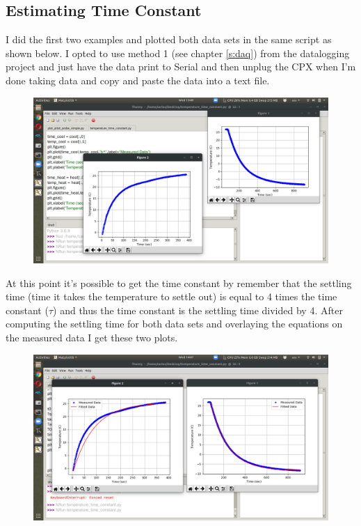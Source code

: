 \subsection{Estimating Time Constant}
I did the first two examples and plotted both data sets in the same script as shown below. I opted to use method 1 (see chapter \ref{s:daq}) from the datalogging project and just have the data print to Serial and then unplug the CPX when I’m done taking data and copy and paste the data into a text file.
\begin{figure}[H]
  \begin{center}
    \includegraphics[width=\textwidth]{Figures/thermistor_plots.png}
  \end{center}
\end{figure}
At this point it’s possible to get the time constant by remember that the settling time (time it takes the temperature to settle out) is equal to 4 times the time constant ($\tau$) and thus the time constant is the settling time divided by 4. After computing the settling time for both data sets and overlaying the equations on the measured data I get these two plots.
\begin{figure}[H]
  \begin{center}
    \includegraphics[width=\textwidth]{Figures/thermistor_plots2.png}
  \end{center}
\end{figure}

